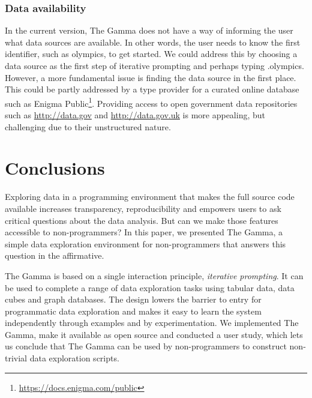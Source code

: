 \documentclass[manuscript,review,anonymous]{acmart}
\newcommand{\ikvd}[1]{{\fontfamily{zi4}\selectfont\small #1}}
\begin{document}
\subsubsection*{Data availability}
In the current version, The Gamma does not have a way of informing the user what data sources
are available. In other words, the user needs to know the first identifier, such as \ikvd{olympics},
to get started. We could address this by choosing a data source as the first step of iterative
prompting and perhaps typing \ikvd{.olympics}. However, a more fundamental issue is finding
the data source in the first place. This could be partly addressed by a type provider for a
curated online database such as Enigma Public\footnote{\url{https://docs.enigma.com/public}}.
Providing access to open government data repositories such as \url{http://data.gov} and
\url{http://data.gov.uk} is more appealing, but challenging due to their unstructured nature.

\section{Conclusions}
Exploring data in a programming environment that makes the full source code available increases
transparency, reproducibility and empowers users to ask critical questions about the data analysis.
But can we make those features accessible to non-programmers? In this paper, we presented The Gamma,
a simple data exploration environment for non-programmers that answers this question in the
affirmative.

The Gamma is based on a single interaction principle, \emph{iterative prompting}. It can be used to
complete a range of data exploration tasks using tabular data, data cubes and graph databases.
The design lowers the barrier to entry for programmatic data exploration and makes it easy to learn
the system independently through examples and by experimentation. We implemented The Gamma, make it
available as open source and conducted a user study, which lets us conclude that
The Gamma can be used by non-programmers to construct non-trivial data exploration scripts.



\end{document}
